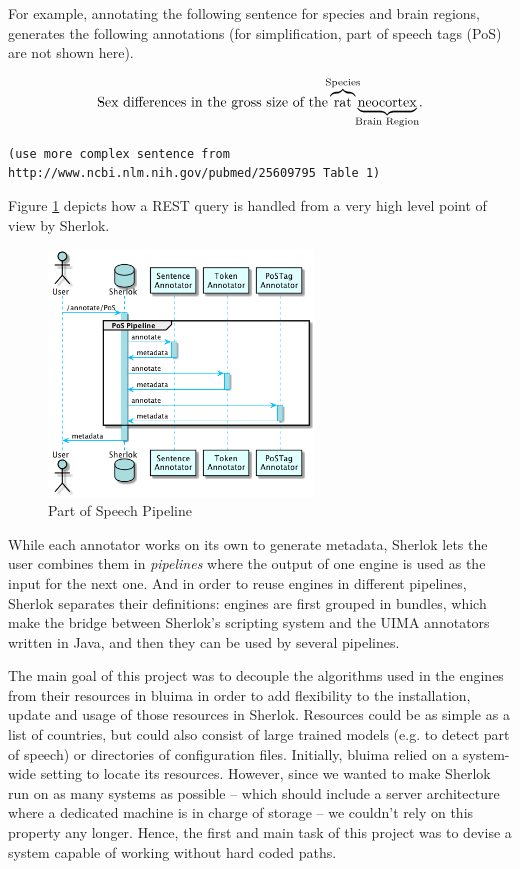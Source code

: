 \documentclass{article}
\newcommand{\TODO}[1]{\texttt{\textcolor{YellowOrange}{(#1)}}} %
\begin{document}
For example, annotating the following sentence for species and brain regions, generates the
following annotations (for simplification, part of speech tags (PoS) are not shown here).

\[
    \text{Sex differences in the gross size of the}
    \overbrace{\text{rat}}^{\mathclap{\text{Species}}}
    \underbrace{\text{neocortex}}_{\mathclap{\text{Brain Region}}} \text{.}
\]

\TODO{use more complex sentence from http://www.ncbi.nlm.nih.gov/pubmed/25609795 Table 1}

Figure \ref{fig:sherlok_basic_rest_call} depicts how a REST query is handled from a very high level
point of view by Sherlok.

\begin{figure}
    \centering
    \includegraphics[width=200pt]{res/sherlok_basic_rest_call.png}
    \caption{Part of Speech Pipeline}
    \label{fig:sherlok_basic_rest_call}
\end{figure}

While each annotator works on its own to generate metadata, Sherlok lets the user combines them in
\emph{pipelines} where the output of one engine is used as the input for the next one. And in order
to reuse engines in different pipelines, Sherlok separates their definitions: engines are first
grouped in bundles, which make the bridge between Sherlok's scripting system and the UIMA annotators
written in Java, and then they can be used by several pipelines.

The main goal of this project was to decouple the algorithms used in the engines from their
resources in bluima in order to add flexibility to the installation, update and usage of those
resources in Sherlok. Resources could be as simple as a list of countries, but could also consist of
large trained models (e.g. to detect part of speech) or directories of configuration files.
Initially, bluima relied on a system-wide setting to locate its resources.  However, since we wanted
to make Sherlok run on as many systems as possible -- which should include a server architecture
where a dedicated machine is in charge of storage -- we couldn't rely on this property any longer.
Hence, the first and main task of this project was to devise a system capable of working without
hard coded paths.
\end{document}
